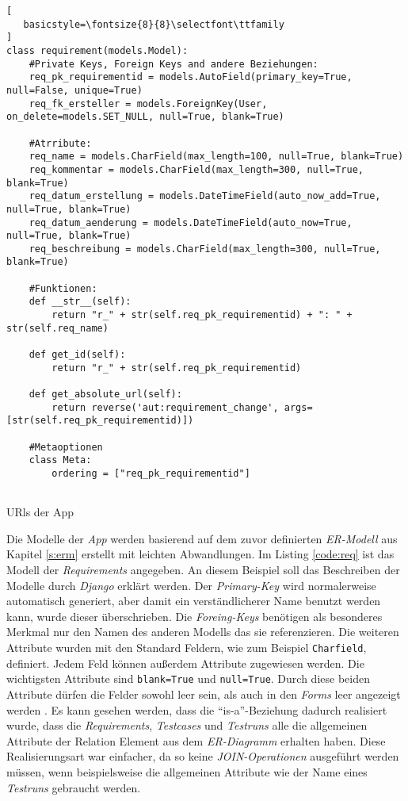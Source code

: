 \documentclass[11pt,a4paper]{report}
\begin{document}
\begin{listing}[htbp]
\begin{lstlisting}[
   basicstyle=\fontsize{8}{8}\selectfont\ttfamily
]
class requirement(models.Model):
    #Private Keys, Foreign Keys and andere Beziehungen:
    req_pk_requirementid = models.AutoField(primary_key=True, null=False, unique=True)
    req_fk_ersteller = models.ForeignKey(User, on_delete=models.SET_NULL, null=True, blank=True)

    #Atrribute:
    req_name = models.CharField(max_length=100, null=True, blank=True)
    req_kommentar = models.CharField(max_length=300, null=True, blank=True)
    req_datum_erstellung = models.DateTimeField(auto_now_add=True, null=True, blank=True)
    req_datum_aenderung = models.DateTimeField(auto_now=True, null=True, blank=True)
    req_beschreibung = models.CharField(max_length=300, null=True, blank=True)

    #Funktionen:
    def __str__(self):
        return "r_" + str(self.req_pk_requirementid) + ": " + str(self.req_name)

    def get_id(self):
        return "r_" + str(self.req_pk_requirementid)

    def get_absolute_url(self):
        return reverse('aut:requirement_change', args=[str(self.req_pk_requirementid)])

    #Metaoptionen
    class Meta:
        ordering = ["req_pk_requirementid"]


\end{lstlisting}
\caption{URls der App}
\label{code:req}
\end{listing}

Die Modelle der \textit{App} werden basierend auf dem zuvor definierten \textit{ER-Modell} aus Kapitel \ref{s:erm} erstellt mit leichten Abwandlungen. Im Listing \ref{code:req} ist das Modell der \textit{Requirements} angegeben. An diesem Beispiel soll das Beschreiben der Modelle durch \textit{Django} erklärt werden. Der \textit{Primary-Key} wird normalerweise automatisch generiert, aber damit ein verständlicherer Name benutzt werden kann, wurde dieser überschrieben. Die \textit{Foreing-Keys} benötigen als besonderes Merkmal nur den Namen des anderen Modells das sie referenzieren. Die weiteren Attribute wurden mit den Standard Feldern, wie zum Beispiel \verb|Charfield|, definiert. Jedem Feld können außerdem Attribute zugewiesen werden. Die wichtigsten Attribute sind \verb|blank=True| und \verb|null=True|. Durch diese beiden Attribute dürfen die Felder sowohl leer sein, als auch in den \textit{Forms} leer angezeigt werden \cite{mozillatuto5}. Es kann gesehen werden, dass die "`is-a"'-Beziehung dadurch realisiert wurde, dass die \textit{Requirements}, \textit{Testcases} und \textit{Testruns} alle die allgemeinen Attribute der Relation Element aus dem \textit{ER-Diagramm} erhalten haben. Diese Realisierungsart war einfacher, da so keine \textit{JOIN-Operationen} ausgeführt werden müssen, wenn beispielsweise die allgemeinen Attribute wie der Name eines \textit{Testruns} gebraucht werden.
\end{document}
